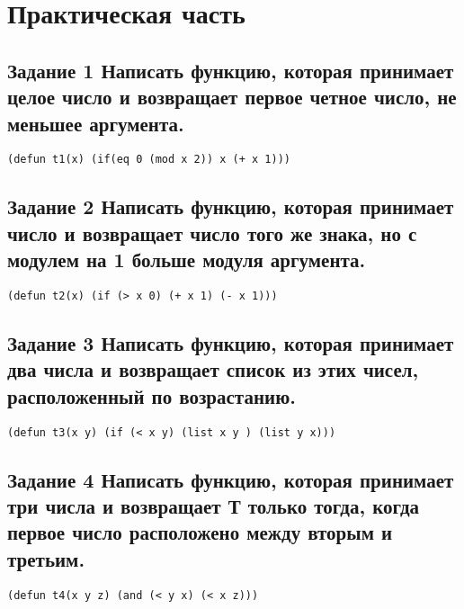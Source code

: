 \chapter{Практическая часть}

\section{Задание 1 Написать функцию, которая принимает целое число и возвращает первое
	четное число, не меньшее аргумента.}
\begin{center}
	\begin{lstlisting}[label=a1, caption={Выражение 1}]
(defun t1(x) (if(eq 0 (mod x 2)) x (+ x 1)))
\end{lstlisting}
\end{center}

\section{Задание 2 Написать функцию, которая принимает число и возвращает число
	того же знака, но с модулем на 1 больше модуля аргумента.}
\begin{center}
	\begin{lstlisting}[label=a2, caption={Выражение 2}]
(defun t2(x) (if (> x 0) (+ x 1) (- x 1)))
	\end{lstlisting}
\end{center}

\section{Задание 3 Написать функцию, которая принимает два числа и возвращает
	список из этих чисел, расположенный по возрастанию.}
\begin{center}
	\begin{lstlisting}[label=a3, caption={Выражение 3}]
(defun t3(x y) (if (< x y) (list x y ) (list y x)))
	\end{lstlisting}
\end{center}

\section{Задание 4 Написать функцию, которая принимает три числа и возвращает Т только
	тогда, когда первое число расположено между вторым и третьим.}
\begin{center}
	\begin{lstlisting}[label=a4, caption={Выражение 4}]
(defun t4(x y z) (and (< y x) (< x z)))
	\end{lstlisting}
\end{center}

